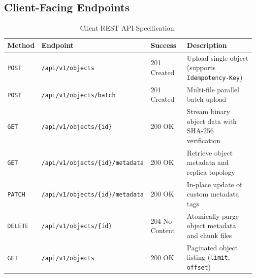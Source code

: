 \documentclass[11pt,a4paper]{article}
\begin{document}
\subsection{Client-Facing Endpoints}
\begin{table}[H]
\centering
\small
\begin{tabular}{@{}llll@{}}
\toprule
\textbf{Method} & \textbf{Endpoint} & \textbf{Success} & \textbf{Description} \\ \midrule
\texttt{POST}   & \texttt{/api/v1/objects}          & 201 Created    & Upload single object (supports \texttt{Idempotency-Key}) \\
\texttt{POST}   & \texttt{/api/v1/objects/batch}    & 201 Created    & Multi-file parallel batch upload \\
\texttt{GET}    & \texttt{/api/v1/objects/\{id\}}   & 200 OK         & Stream binary object data with SHA-256 verification \\
\texttt{GET}    & \texttt{/api/v1/objects/\{id\}/metadata} & 200 OK  & Retrieve object metadata and replica topology \\
\texttt{PATCH}  & \texttt{/api/v1/objects/\{id\}/metadata} & 200 OK  & In-place update of custom metadata tags \\
\texttt{DELETE} & \texttt{/api/v1/objects/\{id\}}   & 204 No Content & Atomically purge object metadata and chunk files \\
\texttt{GET}    & \texttt{/api/v1/objects}          & 200 OK         & Paginated object listing (\texttt{limit}, \texttt{offset}) \\ \bottomrule
\end{tabular}
\caption{Client REST API Specification.}
\label{tab:client_api}
\end{table}
\end{document}
